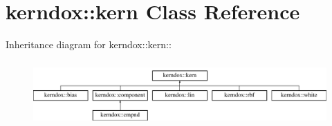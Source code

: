\hypertarget{classkerndox_1_1kern}{
\section{kerndox::kern Class Reference}
\label{classkerndox_1_1kern}
}
Inheritance diagram for kerndox::kern::\begin{figure}[H]
\begin{center}
\leavevmode
\includegraphics[height=2.54545cm]{classkerndox_1_1kern}
\end{center}
\end{figure}
